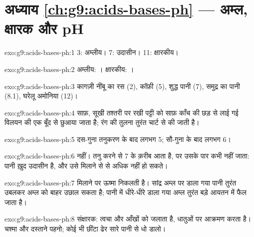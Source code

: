 \section*{अध्याय \ref{ch:g9:acids-bases-ph} --- अम्ल, क्षारक और pH}

\begin{solution}{exo:g9:acids-bases-ph:1}
 3: अम्लीय।  7: उदासीन।  11: क्षारकीय।
\end{solution}

\begin{solution}{exo:g9:acids-bases-ph:2}
अम्लीय:  । क्षारकीय:  ।
\end{solution}

\begin{solution}{exo:g9:acids-bases-ph:3}
कागज़ी नींबू का रस (2), कॉफ़ी (5), शुद्ध पानी (7), समुद्र का पानी (8.1), घरेलू
अमोनिया (12)।
\end{solution}

\begin{solution}{exo:g9:acids-bases-ph:4}
साफ़, सूखी तश्तरी पर रखी पट्टी को साफ़ काँच की छड़ से लाई गई विलयन की एक बूँद
से छुआया जाता है; रंग की तुलना तुरंत
चार्ट से की जाती है।
\end{solution}

\begin{solution}{exo:g9:acids-bases-ph:5}
दस-गुना तनुकरण के बाद लगभग 5; सौ-गुना के बाद लगभग 6।
\end{solution}

\begin{solution}{exo:g9:acids-bases-ph:6}
नहीं। तनु करने से  7 के क़रीब आता है, पर उसके पार कभी नहीं जाता: पानी ख़ुद
उदासीन है, और उसे मिलाने से   
 से अधिक नहीं हो सकते।
\end{solution}

\begin{solution}{exo:g9:acids-bases-ph:7}
मिलाने पर ऊष्मा निकलती है। सांद्र अम्ल पर डाला गया पानी तुरंत उबलकर अम्ल को
बाहर उछाल सकता है; पानी में धीरे-धीरे डाला गया अम्ल तुरंत बड़े आयतन में
फैल जाता है।
\end{solution}

\begin{solution}{exo:g9:acids-bases-ph:8}
संक्षारक: त्वचा और आँखों को जलाता है, धातुओं पर आक्रमण करता है। चश्मा और दस्ताने
पहनो; कोई भी छींटा ढेर सारे पानी से धो डालो।
\end{solution}

